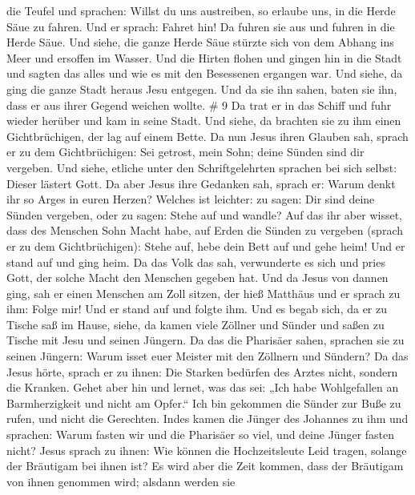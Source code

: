 die Teufel und sprachen: Willst du uns austreiben, so erlaube uns, in
die Herde Säue zu fahren.  Und er sprach: Fahret hin! Da
fuhren sie aus und fuhren in die Herde Säue. Und siehe, die ganze Herde
Säue stürzte sich von dem Abhang ins Meer und ersoffen im Wasser.
 Und die Hirten flohen und gingen hin in die Stadt und
sagten das alles und wie es mit den Besessenen ergangen war.
 Und siehe, da ging die ganze Stadt heraus Jesu entgegen.
Und da sie ihn sahen, baten sie ihn, dass er aus ihrer Gegend weichen
wollte. \# 9  Da trat er in das Schiff und fuhr wieder
herüber und kam in seine Stadt.  Und siehe, da brachten sie
zu ihm einen Gichtbrüchigen, der lag auf einem Bette. Da nun Jesus ihren
Glauben sah, sprach er zu dem Gichtbrüchigen: Sei getrost, mein Sohn;
deine Sünden sind dir vergeben.  Und siehe, etliche unter
den Schriftgelehrten sprachen bei sich selbst: Dieser lästert Gott.
 Da aber Jesus ihre Gedanken sah, sprach er: Warum denkt ihr
so Arges in euren Herzen?  Welches ist leichter: zu sagen:
Dir sind deine Sünden vergeben, oder zu sagen: Stehe auf und wandle?
 Auf das ihr aber wisset, dass des Menschen Sohn Macht habe,
auf Erden die Sünden zu vergeben (sprach er zu dem Gichtbrüchigen):
Stehe auf, hebe dein Bett auf und gehe heim!  Und er stand
auf und ging heim.  Da das Volk das sah, verwunderte es sich
und pries Gott, der solche Macht den Menschen gegeben hat. 
Und da Jesus von dannen ging, sah er einen Menschen am Zoll sitzen, der
hieß Matthäus und er sprach zu ihm: Folge mir! Und er stand auf und
folgte ihm.  Und es begab sich, da er zu Tische saß im
Hause, siehe, da kamen viele Zöllner und Sünder und saßen zu Tische mit
Jesu und seinen Jüngern.  Da das die Pharisäer sahen,
sprachen sie zu seinen Jüngern: Warum isset euer Meister mit den
Zöllnern und Sündern?  Da das Jesus hörte, sprach er zu
ihnen: Die Starken bedürfen des Arztes nicht, sondern die Kranken.
 Gehet aber hin und lernet, was das sei: „Ich habe
Wohlgefallen an Barmherzigkeit und nicht am Opfer.`` Ich bin gekommen
die Sünder zur Buße zu rufen, und nicht die Gerechten. 
Indes kamen die Jünger des Johannes zu ihm und sprachen: Warum fasten
wir und die Pharisäer so viel, und deine Jünger fasten nicht?
 Jesus sprach zu ihnen: Wie können die Hochzeitsleute Leid
tragen, solange der Bräutigam bei ihnen ist? Es wird aber die Zeit
kommen, dass der Bräutigam von ihnen genommen wird; alsdann werden sie

